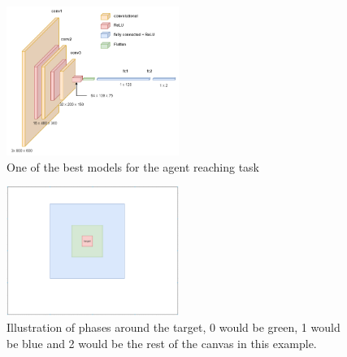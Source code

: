 \begin{figure}[h]
  \centering
  \includegraphics[width=0.5\textwidth]{assets/early-work/cnn-diagram.png}
  \caption{One of the best models for the agent reaching task}\label{fig:cnn-5050}
\end{figure}


\begin{figure}[htbp]
  \centering
  \includegraphics[width=0.5\textwidth]{assets/early-work/regions.png}
  \caption{Illustration of phases around the target, 0 would be green, 1 would be blue and 2 would be the rest of the canvas in this example. }\label{fig:phase-regions}
\end{figure}


